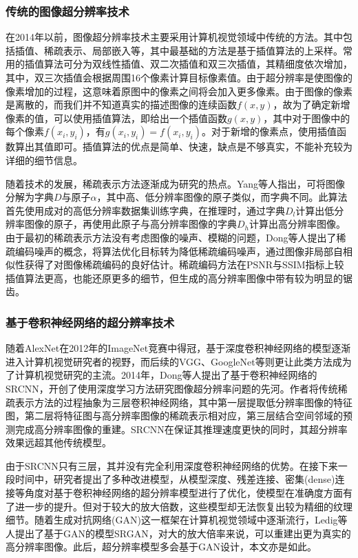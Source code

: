 \subsubsection*{传统的图像超分辨率技术}
在2014年以前，图像超分辨率技术主要采用计算机视觉领域中传统的方法。其中包括插值、稀疏表示、局部嵌入等，其中最基础的方法是基于插值算法的上采样。常用的插值算法可分为双线性插值、双二次插值和双三次插值，其精细度依次增加，其中，双三次插值会根据周围16个像素计算目标像素值。由于超分辨率是使图像的像素增加的过程，这意味着原图中的像素之间将会加入更多像素。由于图像的像素是离散的，而我们并不知道真实的描述图像的连续函数$f(x,y)$，故为了确定新增像素的值，可以使用插值算法，即给出一个插值函数$g(x,y)$，其中对于图像中的每个像素$f(x_i,y_i)$，有$g(x_i,y_i)=f(x_i,y_i)$。对于新增的像素点，使用插值函数算出其值即可。插值算法的优点是简单、快速，缺点是不够真实，不能补充较为详细的细节信息。

随着技术的发展，稀疏表示方法逐渐成为研究的热点。Yang等人\cite{4587647}指出，可将图像分解为字典$D$与原子$\alpha$，其中高、低分辨率图像的原子类似，而字典不同。此算法首先使用成对的高低分辨率数据集训练字典，在推理时，通过字典$D_l$计算出低分辨率图像的原子，再使用此原子与高分辨率图像的字典$D_h$计算出高分辨率图像。由于最初的稀疏表示方法没有考虑图像的噪声、模糊的问题，Dong等人\cite{6392274}提出了稀疏编码噪声的概念，将算法优化目标转为降低稀疏编码噪声，通过图像非局部自相似性获得了对图像稀疏编码的良好估计。稀疏编码方法在PSNR与SSIM\cite{wang2002universal}指标上较插值算法更高，也能还原更多的细节，但生成的高分辨率图像中带有较为明显的锯齿。


\subsubsection*{基于卷积神经网络的超分辨率技术}
随着AlexNet\cite{NIPS2012_c399862d}在2012年的ImageNet竞赛中得冠，基于深度卷积神经网络的模型逐渐进入计算机视觉研究者的视野，而后续的VGG\cite{simonyan2014very}、GoogleNet\cite{szegedy2015going}等则更让此类方法成为了计算机视觉研究的主流。2014年，Dong等人\cite{SRCNN}提出了基于卷积神经网络的SRCNN，开创了使用深度学习方法研究图像超分辨率问题的先河。作者将传统稀疏表示方法的过程抽象为三层卷积神经网络，其中第一层提取低分辨率图像的特征图，第二层将特征图与高分辨率图像的稀疏表示相对应，第三层结合空间邻域的预测完成高分辨率图像的重建。SRCNN在保证其推理速度更快的同时，其超分辨率效果远超其他传统模型。

由于SRCNN只有三层，其并没有完全利用深度卷积神经网络的优势。在接下来一段时间中，研究者提出了多种改进模型，从模型深度\cite{vedaldi15matconvnet}、残差连接\cite{Lim_2017_CVPR_Workshops}、密集(dense)连接\cite{wang2018esrgan}等角度对基于卷积神经网络的超分辨率模型进行了优化，使模型在准确度方面有了进一步的提升。但对于较大的放大倍数，这些模型却无法恢复出较为精细的纹理细节。随着生成对抗网络\cite{goodfellow2020generative}(GAN)这一框架在计算机视觉领域中逐渐流行，Ledig等人\cite{fritsche2019frequency}提出了基于GAN的模型SRGAN，对大的放大倍率来说，可以重建出更为真实的高分辨率图像。此后，超分辨率模型多会基于GAN设计，本文亦是如此。



